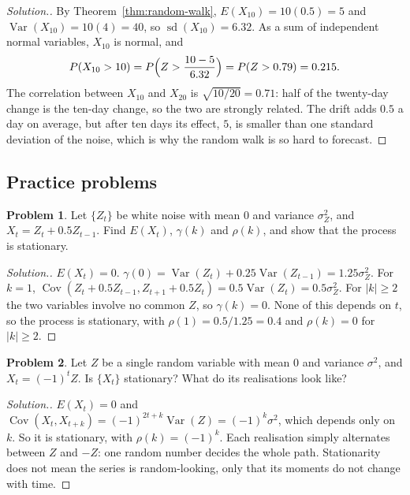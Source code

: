 \documentclass[11pt,a4paper]{article}
\theoremstyle{definition}
\newtheorem{problemx}{Problem}[subsection]
\newenvironment{problem}{\begin{problemx}}{\end{problemx}}
\newenvironment{solution}
  {\renewcommand{\qedsymbol}{}\begin{proof}[\textit{Solution}.]}
  {\end{proof}}
\DeclareMathOperator{\Var}{Var}
\DeclareMathOperator{\Cov}{Cov}
\begin{document}
\begin{solution}
By Theorem~\ref{thm:random-walk}, $E(X_{10}) = 10(0.5) = 5$ and $\Var(X_{10}) = 10(4) = 40$, so $\operatorname{sd}(X_{10}) = 6.32$. As a sum of independent
normal variables, $X_{10}$ is normal, and
\[
P(X_{10} > 10) = P\Bigl(Z > \frac{10 - 5}{6.32}\Bigr) = P(Z > 0.79) = 0.215 .
\]
The correlation between $X_{10}$ and $X_{20}$ is $\sqrt{10/20} = 0.71$: half of the twenty-day change is the ten-day change, so the
two are strongly related. The drift adds $0.5$ a day on average, but after ten days its effect, $5$, is smaller than one
standard deviation of the noise, which is why the random walk is so hard to forecast.
\end{solution}

\subsection{Practice problems}
\begin{problem}\label{prob:ts-ma1-stationary}
Let $\{Z_t\}$ be white noise with mean $0$ and variance $\sigma_Z^2$, and $X_t = Z_t + 0.5Z_{t-1}$. Find $E(X_t)$, $\gamma(k)$ and $\rho(k)$, and show
that the process is stationary.
\end{problem}

\begin{solution}
$E(X_t) = 0$. $\gamma(0) = \Var(Z_t) + 0.25\Var(Z_{t-1}) = 1.25\sigma_Z^2$. For $k = 1$, $\Cov(Z_t + 0.5Z_{t-1}, Z_{t+1} + 0.5Z_t) = 0.5\Var(Z_t) = 0.5\sigma_Z^2$. For $|k| \ge 2$ the
two variables involve no common $Z$, so $\gamma(k) = 0$. None of this depends on $t$, so the process is stationary, with
$\rho(1) = 0.5/1.25 = 0.4$ and $\rho(k) = 0$ for $|k| \ge 2$.
\end{solution}

\begin{problem}\label{prob:ts-sign}
Let $Z$ be a single random variable with mean $0$ and variance $\sigma^2$, and $X_t = (-1)^tZ$. Is $\{X_t\}$ stationary? What do its
realisations look like?
\end{problem}

\begin{solution}
$E(X_t) = 0$ and $\Cov(X_t, X_{t+k}) = (-1)^{2t+k}\Var(Z) = (-1)^k\sigma^2$, which depends only on $k$. So it is stationary, with $\rho(k) = (-1)^k$. Each
realisation simply alternates between $Z$ and $-Z$: one random number decides the whole path. Stationarity
does not mean the series is random-looking, only that its moments do not change with time.
\end{solution}
\end{document}
